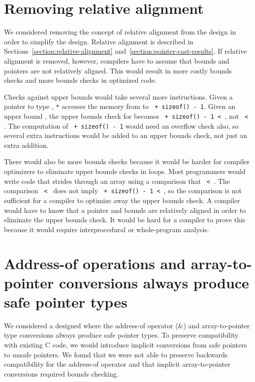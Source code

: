 \section{Removing relative alignment}
\label{section:design-alternatives:always-unaligned}

We considered removing the concept of relative alignment from the design in order
to simplify the design. 
Relative alignment is described in Sections~\ref{section:relative-alignment}
and~\ref{section:pointer-cast-results}.  If relative alignment
is removed, however, compilers have to assume that bounds and pointers are
not relatively aligned.   This would result in more costly bounds checks and
more bounds checks in optimized code.

Checks against upper bounds would  take several more instructions.
Given a pointer  to type , \texttt{*} accesses the memory from
 to \texttt{ + sizeof() - 1}. Given an upper bound , the
upper bounds check for  becomes \texttt{ + sizeof() - 1 < },
not \texttt{ < }.  The
computation of \texttt{ + sizeof() - 1} would need an overflow check also, 
so several extra instructions would be added to an upper bounds check, 
not just an extra addition.

There would also be more bounds checks because it would be harder for compiler optimizers
to eliminate upper bounds checks in loops.  Most programmers would write code that
strides through an array using a comparison that
\texttt{ \textless{} }. The comparison 
\texttt{ < } does not imply
\texttt{ + sizeof() - 1 < }, so the comparison is
not sufficient for a compiler to optimize away
the upper bounds check. A compiler would have to know that a pointer
and bounds are relatively aligned in order to eliminate the upper bounds
check. It would be hard for a compiler to prove this because it would
require interprocedural or whole-program analysis.

\section{Address-of operations and array-to-pointer conversions always produce safe pointer types}

We considered a designed where the address-of operator (\&) and
array-to-pointer type conversions always produce safe pointer types. To
preserve compatibility with existing C code, we would introduce implicit
conversions from safe pointers to unsafe pointers. We found that we were
not able to preserve backwards compatibility for the address-of operator
and that implicit array-to-pointer conversions required bounds checking.

